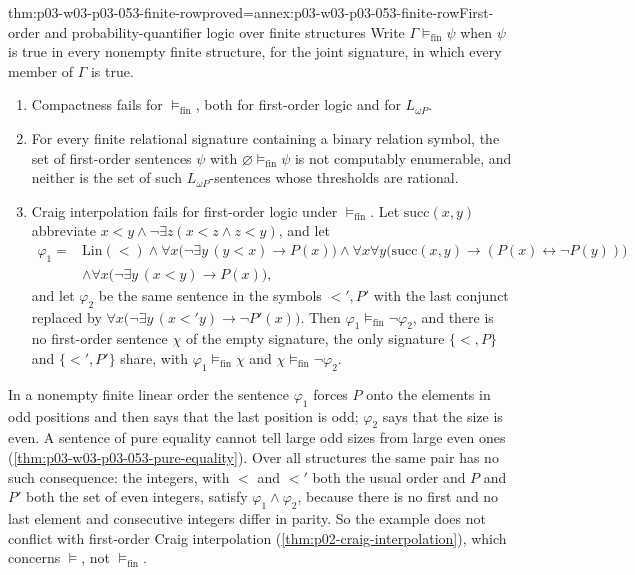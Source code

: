 \begin{hbtheorem}{thm:p03-w03-p03-053-finite-row}{proved=annex:p03-w03-p03-053-finite-row}{First-order and probability-quantifier logic over finite structures}
Write \(\Gamma\models_{\mathrm{fin}}\psi\) when \(\psi\) is true in every
nonempty finite structure, for the joint signature, in which every
member of \(\Gamma\) is true.
\begin{enumerate}
\item Compactness fails for \(\models_{\mathrm{fin}}\), both for
  first-order logic and for \(L_{\omega P}\).
\item For every finite relational signature containing a binary relation
  symbol, the set of first-order sentences \(\psi\) with
  \(\varnothing\models_{\mathrm{fin}}\psi\) is not computably enumerable,
  and neither is the set of such \(L_{\omega P}\)-sentences whose
  thresholds are rational.
\item Craig interpolation fails for first-order logic under
  \(\models_{\mathrm{fin}}\). Let \(\mathrm{succ}(x,y)\) abbreviate
  \(x<y\land\neg\exists z(x<z\land z<y)\), and let
  \[
  \begin{aligned}
   \varphi_1={}&\mathrm{Lin}(<)\land
     \forall x\bigl(\neg\exists y\,(y<x)\to P(x)\bigr)\land
     \forall x\forall y\bigl(\mathrm{succ}(x,y)\to
       (P(x)\leftrightarrow\neg P(y))\bigr)\\
     &\land\forall x\bigl(\neg\exists y\,(x<y)\to P(x)\bigr),
  \end{aligned}
  \]
  and let \(\varphi_2\) be the same sentence in the symbols \(<',P'\)
  with the last conjunct replaced by
  \(\forall x\bigl(\neg\exists y\,(x<'y)\to\neg P'(x)\bigr)\).
  Then \(\varphi_1\models_{\mathrm{fin}}\neg\varphi_2\), and there is no
  first-order sentence \(\chi\) of the empty signature, the only
  signature \(\{<,P\}\) and \(\{<',P'\}\) share, with
  \(\varphi_1\models_{\mathrm{fin}}\chi\) and
  \(\chi\models_{\mathrm{fin}}\neg\varphi_2\).
\end{enumerate}
\end{hbtheorem}

In a nonempty finite linear order the sentence \(\varphi_1\) forces
\(P\) onto the elements in odd positions and then says that the last
position is odd; \(\varphi_2\) says that the size is even. A sentence of
pure equality cannot tell large odd sizes from large even ones
(\cref{thm:p03-w03-p03-053-pure-equality}). Over all structures the same
pair has no such consequence: the integers, with \(<\) and \(<'\) both the
usual order and \(P\) and \(P'\) both the set of even integers, satisfy
\(\varphi_1\land\varphi_2\), because there is no first and no last element
and consecutive integers differ in parity. So the example does not
conflict with first-order Craig interpolation
(\cref{thm:p02-craig-interpolation}), which concerns \(\models\), not
\(\models_{\mathrm{fin}}\).

